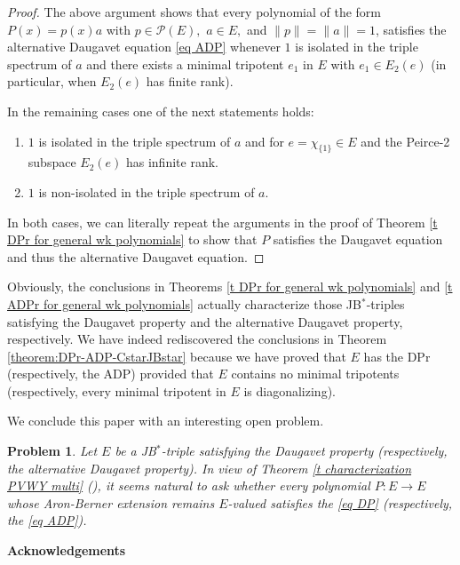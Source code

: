 \documentclass[10pt]{amsart}
\newtheorem{problem}[theorem]{Problem}
\begin{document}
\begin{proof}
		The above argument shows that every polynomial of the form $P (x) = p(x) a$ with $p\in \mathcal{P} (E),$ $a\in E,$ and $\|p\| = \|a\|=1$, satisfies the alternative Daugavet equation \eqref{eq ADP} whenever $1$ is isolated in the triple spectrum of $a$ and there exists a minimal tripotent $e_1$ in $E$ with $e_1 \in  E_2(e)$ (in particular, when $E_2(e)$ has finite rank).
		
		In the remaining cases one of the next statements holds:\begin{enumerate}[$(a)$] \item  $1$ is isolated in the triple spectrum of $a$ and for $e= \chi_{\{1\}}\in E$ and the Peirce-2 subspace $E_2(e)$ has infinite rank.
			\item $1$ is non-isolated in the triple spectrum of $a.$
		\end{enumerate}
		In both cases, we can literally repeat the arguments in the proof of Theorem \ref{t DPr for general wk polynomials} to show that $P$ satisfies the Daugavet equation and thus the alternative Daugavet equation.
	\end{proof}
	
	Obviously, the conclusions in Theorems \ref{t DPr for general wk polynomials} and \ref{t ADPr for general wk polynomials} actually characterize those JB$^*$-triples satisfying the Daugavet property and the alternative Daugavet property, respectively. We have indeed rediscovered the conclusions in Theorem \ref{theorem:DPr-ADP-CstarJBstar} because we have proved that $E$ has the DPr (respectively, the ADP) provided that $E$ contains no minimal tripotents (respectively, every minimal tripotent in $E$ is diagonalizing).
	
	We conclude this paper with an interesting open problem.
	
	\begin{problem}
		Let $E$ be a JB$^*$-triple satisfying the Daugavet property {\rm(}respectively, the alternative Daugavet property{\rm)}.
		In view of Theorem \ref{t characterization PVWY multi} {\rm(}\cite[Theorem 3.9]{PeViWriYl2010multi}{\rm)}, it seems natural to ask whether every polynomial $P\colon E \longrightarrow E$ whose Aron-Berner extension remains $E$-valued satisfies the \eqref{eq DP} {\rm(}respectively, the \eqref{eq ADP}{\rm)}.
	\end{problem}
	
	
	
	\smallskip\smallskip
	
	
	\textbf{Acknowledgements}
\end{document}
